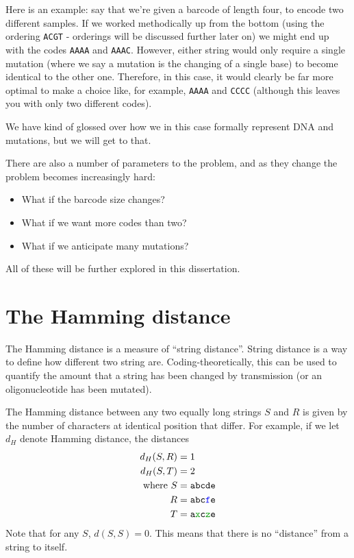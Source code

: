 \documentclass[a4paper,11pt]{article}
\begin{document}
    Here is an example: say that we're given a barcode of length four, to encode
    two different samples. If we worked methodically up from the bottom (using
    the ordering \texttt{ACGT} - orderings will be discussed further later on)
    we might end up with the codes \texttt{AAAA} and \texttt{AAAC}. However,
    either string would only require a single mutation (where we say a mutation
    is the changing of a single base) to become identical to the other one.
    Therefore, in this case, it would clearly be far more optimal to make a
    choice like, for example, \texttt{AAAA} and \texttt{CCCC} (although this
    leaves you with only two different codes).

    We have kind of glossed over how we in this case formally represent DNA and
    mutations, but we will get to that.

    There are also a number of parameters to the problem, and as they change
    the problem becomes increasingly hard:

    \begin{itemize}
    \item What if the barcode size changes?
    \item What if we want more codes than two?
    \item What if we anticipate many mutations?
    \end{itemize}

    All of these will be further explored in this dissertation.

    \section{The Hamming distance}

    The Hamming distance is a measure of ``string distance''. String
    distance is a way to define how different two string are.
    Coding-theoretically, this can be used to quantify the amount that a
    string has been changed by transmission (or an oligonucleotide has been
    mutated).

    The Hamming distance between any two equally long strings $S$ and $R$
    is given by the number of characters at identical position that differ.
    For example, if we let $d_H$ denote Hamming distance, the distances
    \begin{align*}
    d_H(S, R) &= 1\\
    d_H(S, T) &= 2\\
    \text{where}\
    S &= \texttt{abcde}\\
    R &= \texttt{abc\textcolor{blue}{f}e}\\
    T &= \texttt{a\textcolor{codegreen}{x}c\textcolor{codegreen}{z}e}
    \end{align*}
    Note that for any $S$, $d(S, S) = 0$. This means that there is no
    ``distance'' from a string to itself.
\end{document}
